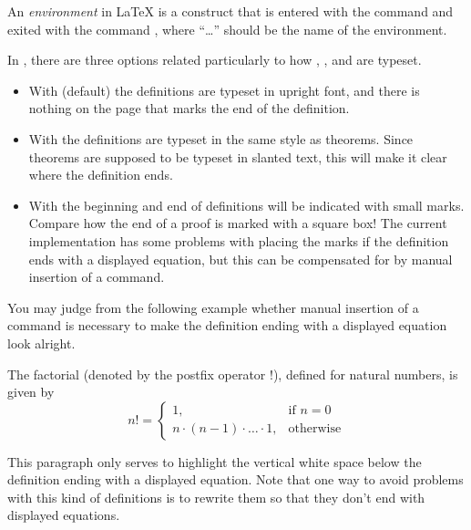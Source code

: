 \begin{definition}
  An \emph{environment} in \LaTeX{} is a construct that is entered with the command  and exited with the command , where “\ldots” should be the name of the environment.
\end{definition}

In , there are three options related particularly to how , , and  are typeset.
\begin{itemize}
\item With  (default) the definitions are typeset in upright font, and there is nothing on the page that marks the end of the definition.
\item With  the definitions are typeset in the same style as theorems.  Since theorems are supposed to be typeset in slanted text, this will make it clear where the definition ends.
\item With  the beginning and end of definitions will be indicated with small marks.  Compare how the end of a proof is marked with a square box!  The current implementation has some problems with placing the marks if the definition ends with a displayed equation, but this can be compensated for by manual insertion of a  command.
\end{itemize}

You may judge from the following example whether manual insertion of a  command is necessary to make the definition ending with a displayed equation look alright.

\begin{definition}
  The factorial (denoted by the postfix operator $!$), defined for natural numbers, is given by
  \begin{equation*}
    n! =
    \begin{cases}
      1, & \text{if $n = 0$} \\
      n \cdot (n-1) \cdot \dotsc \cdot 1, & \text{otherwise}
    \end{cases}
  \end{equation*}
\end{definition}

This paragraph only serves to highlight the vertical white space below the definition ending with a displayed equation.  Note that one way to avoid problems with this kind of definitions is to rewrite them so that they don't end with displayed equations.

